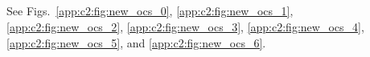 \begin{table}
\begin{tabular}{c c c l}
\end{tabular}


\end{table}

\subsection{}\label{app:c2:new_oc_plots}

See Figs.~\ref{app:c2:fig:new_ocs_0}, \ref{app:c2:fig:new_ocs_1}, \ref{app:c2:fig:new_ocs_2}, \ref{app:c2:fig:new_ocs_3}, \ref{app:c2:fig:new_ocs_4}, \ref{app:c2:fig:new_ocs_5}, and \ref{app:c2:fig:new_ocs_6}.

